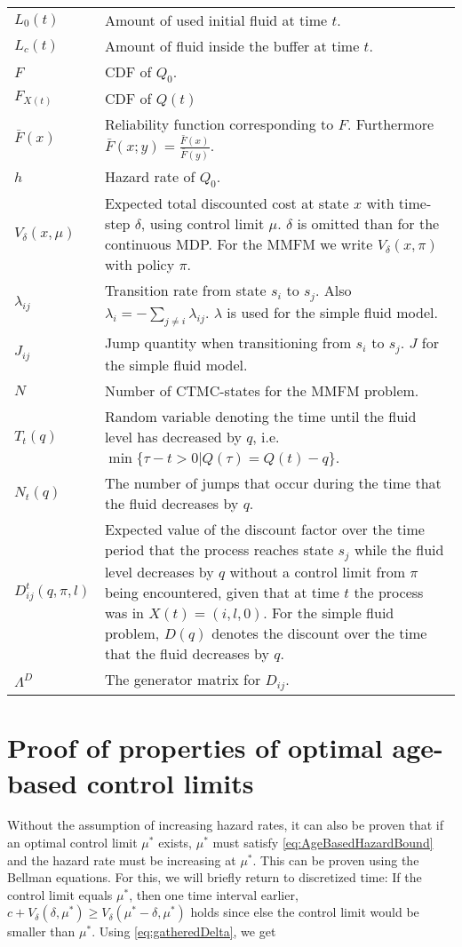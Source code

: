 \documentclass[a4paper]{thesis}
\theoremstyle{definition}
\begin{document}
\begin{appendices}
\begin{tabularx}{\linewidth}{l|L}
        $L_0(t)$& Amount of used initial fluid at time $t$.\\
        $L_c(t)$& Amount of fluid inside the buffer at time $t$.\\
        $F$ & CDF of $Q_0$.\\
        $F_{X(t)}$ & CDF of $Q(t)$\\
        $\bar F(x)$& Reliability function corresponding to $F$. Furthermore $\bar F(x;y)=\frac{\bar F(x)}{\bar F(y)}$.\\
        $h$& Hazard rate of $Q_0$.\\                       
		$V_\delta(x,\mu)$ & Expected total discounted cost at state $x$ with time-step $\delta$, using control limit $\mu$. $\delta$ is omitted than for the continuous MDP. For the MMFM we write $V_\delta(x,\pi)$ with policy $\pi$.            \\
		$\lambda_{ij}$& Transition rate from state $s_i$ to $s_j$. Also $\lambda_i=-\sum_{j\neq i}\lambda_{ij}$. $\lambda$ is used for the simple fluid model.\\
		$J_{ij}$& Jump quantity when transitioning from $s_i$ to $s_j$. $J$ for the simple fluid model.\\
		$N$& Number of CTMC-states for the MMFM problem.\\
		$T_t(q)$&Random variable denoting the time until the fluid level has decreased by $q$, i.e. $\min\{\tau-t>0|Q(\tau)=Q(t)-q\}$.\\
		$N_t(q)$&The number of jumps that occur during the time that the fluid decreases by $q$.\\
		$D_{ij}^t(q,\pi,l)$&Expected value of the discount factor over the time period that the process reaches state $s_j$ while the fluid level decreases by $q$ without a control limit from $\pi$ being encountered, given that at time $t$ the process was in $X(t)= (i,l,0)$. For the simple fluid problem, $D(q)$ denotes the discount over the time that the fluid decreases by $q$.\\
		$\Lambda^D$&The generator matrix for $D_{ij}$.\\
	\end{tabularx}
%
 	\chapter{Proof of properties of optimal age-based control limits}\label{AppendixAgeBasedControlLimit}
Without the assumption of increasing hazard rates, it can also be proven that if an optimal control limit $\mu^*$ exists, $\mu^*$ must satisfy \eqref{eq:AgeBasedHazardBound} and the hazard rate must be increasing at $\mu^*$.
This can be proven using the Bellman equations.
For this, we will briefly return to discretized time:
If the control limit equals $\mu^*$, then one time interval earlier, $c+V_\delta(\delta,\mu^*)\geq V_\delta(\mu^*-\delta,\mu^*)$ holds since else the control limit would be smaller than $\mu^*$.
Using \eqref{eq:gatheredDelta}, we get


\end{appendices}
\end{document}
